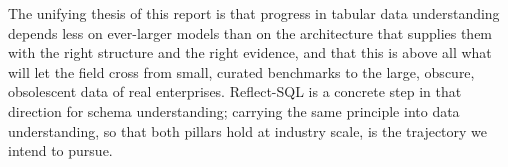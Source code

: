The unifying thesis of this report is that progress in tabular data understanding depends less on ever-larger models than on the architecture that supplies them with the right structure and the right evidence, and that this is above all what will let the field cross from small, curated benchmarks to the large, obscure, obsolescent data of real enterprises. Reflect-SQL is a concrete step in that direction for schema understanding; carrying the same principle into data understanding, so that both pillars hold at industry scale, is the trajectory we intend to pursue.
